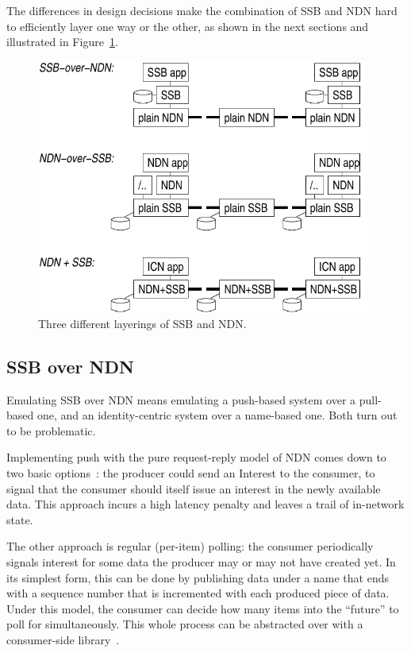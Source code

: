 \documentclass[9pt,sigconf]{acmart}
\begin{document}
The differences in design decisions make the combination of SSB and NDN hard to efficiently layer one way or the other, as shown in the next sections and illustrated in Figure~\ref{fig:ssb-and-ndn}.

\begin{figure}[htb]
  \raggedright
  \includegraphics[width=0.9\columnwidth]{figs/ssb-and-ndn.pdf}
  \caption{\label{fig:ssb-and-ndn}Three different layerings of SSB and NDN.}
\end{figure}

\subsection{SSB over NDN}
\label{ssect:ssb-over-ndn}

Emulating SSB over NDN means emulating a push-based system over a pull-based one, and an identity-centric system over a name-based one. Both turn out to be problematic.

Implementing push with the pure request-reply model of NDN comes down to two basic options~\cite{carzaniga2011pubsub}: the producer could send an Interest to the consumer, to signal that the consumer should itself issue an interest in the newly available data. This approach incurs a high latency penalty and leaves a trail of in-network state.

The other approach is regular (per-item) polling: the consumer periodically signals interest for some data the producer may or may not have created yet. In its simplest form, this can be done by publishing data under a name that ends with a sequence number that is incremented with each produced piece of data. Under this model, the consumer can decide how many items into the ``future'' to poll for simultaneously. This whole process can be abstracted over with a consumer-side library~\cite{moiseenko2014consumer,sardara2018transport}.
\end{document}
